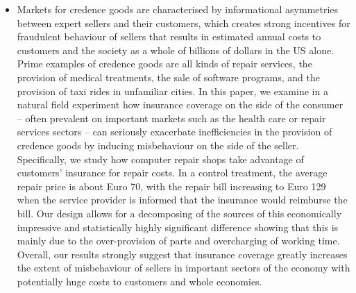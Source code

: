 \begin{itemize}
		\begin{itemize}
			\item Markets for credence goods are characterised by informational asymmetries between expert sellers and their customers, which creates strong incentives for fraudulent behaviour of sellers that results in estimated annual costs to customers and the society as a whole of billions of dollars in the US alone. Prime examples of credence goods are all kinds of repair services, the provision of medical treatments, the sale of software programs, and the provision of taxi rides in unfamiliar cities. In this paper, we examine in a natural field experiment how insurance coverage on the side of the consumer – often prevalent on important markets such as the health care or repair services sectors – can seriously exacerbate inefficiencies in the provision of credence goods by inducing misbehaviour on the side of the seller. Specifically, we study how computer repair shops take advantage of customers’ insurance for repair costs. In a control treatment, the average repair price is about Euro 70, with the repair bill increasing to Euro 129 when the service provider is informed that the insurance would reimburse the bill. Our design allows for a decomposing of the sources of this economically impressive and statistically highly significant difference showing that this is mainly due to the over-provision of parts and overcharging of working time. Overall, our results strongly suggest that insurance coverage greatly increases the extent of misbehaviour of sellers in important sectors of the economy with potentially huge costs to customers and whole economies.
		\end{itemize}
\end{itemize}

\newpage